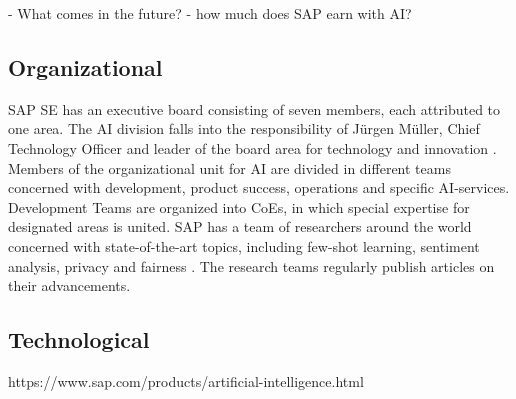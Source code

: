 	- What comes in the future?
	- how much does SAP earn with AI?
	
	\subsection{Organizational}
	SAP SE has an executive board consisting of seven members, each attributed to one area. The \ac{AI} division falls into the responsibility of Jürgen Müller, Chief Technology Officer and leader of the board area for technology and innovation \cite{JuergenMuellerBiography}.
	Members of the organizational unit for \ac{AI} are divided in different teams concerned with development, product success, operations and specific \ac{AI}-services. Development Teams are organized into \acp{CoE}, in which special expertise for designated areas is united.
	SAP has a team of researchers around the world concerned with state-of-the-art topics, including few-shot learning, sentiment analysis, privacy and fairness \cite{AIOverviewResearch}. The research teams regularly publish articles on their advancements.
	
	\subsection{Technological}
	https://www.sap.com/products/artificial-intelligence.html

